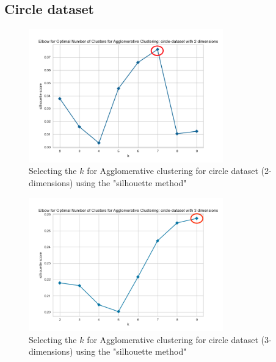 \subsection{Circle dataset}

\begin{figure}[H]
  \includegraphics[width=0.75\textwidth]{Method/images/k-values/circle-dataset-2-agglomerative.png}
  \caption{Selecting the $k$ for Agglomerative clustering for circle dataset (2-dimensions) using the "silhouette method"}
  \label{hyperparameters:agglomerative-circle-dataset-2d}
\end{figure}
\begin{figure}[H]
  \includegraphics[width=0.75\textwidth]{Method/images/k-values/circle-dataset-3-agglomerative.png}
  \caption{Selecting the $k$ for Agglomerative clustering for circle dataset (3-dimensions) using the "silhouette method"}
  \label{hyperparameters:agglomerative-circle-dataset-3d}
\end{figure}
\newpage

